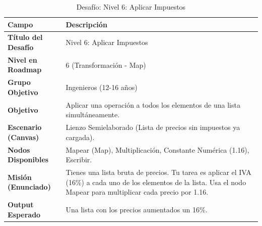 \begin{table}[H]
    \centering
    \caption{Desafío: Nivel 6: Aplicar Impuestos}
    \label{tab:desafio-ing-6}
    \begingroup
    \renewcommand{\arraystretch}{\TableRowStretch}
    \begin{tabularx}{\textwidth}{ l X }
        \hline
        \textbf{Campo}              & \textbf{Descripción}                                                                                                                                                    \\
        \hline
        \textbf{Título del Desafío} & Nivel 6: Aplicar Impuestos                                                                                                                                              \\
        \textbf{Nivel en Roadmap}   & 6 (Transformación - Map)                                                                                                                                                \\
        \textbf{Grupo Objetivo}     & Ingenieros (12-16 años)                                                                                                                                                 \\
        \textbf{Objetivo}           & Aplicar una operación a todos los elementos de una lista simultáneamente.                                                                                               \\
        \textbf{Escenario (Canvas)} & Lienzo Semielaborado (Lista de precios sin impuestos ya cargada).                                                                                                       \\
        \textbf{Nodos Disponibles}  & Mapear (Map), Multiplicación, Constante Numérica (1.16), Escribir.                                                                                                      \\
        \textbf{Misión (Enunciado)} & Tienes una lista bruta de precios. Tu tarea es aplicar el IVA (16\%) a cada uno de los elementos de la lista. Usa el nodo Mapear para multiplicar cada precio por 1.16. \\
        \textbf{Output Esperado}    & Una lista con los precios aumentados un 16\%.                                                                                                                           \\
        \hline
    \end{tabularx}
    \endgroup
\end{table}

